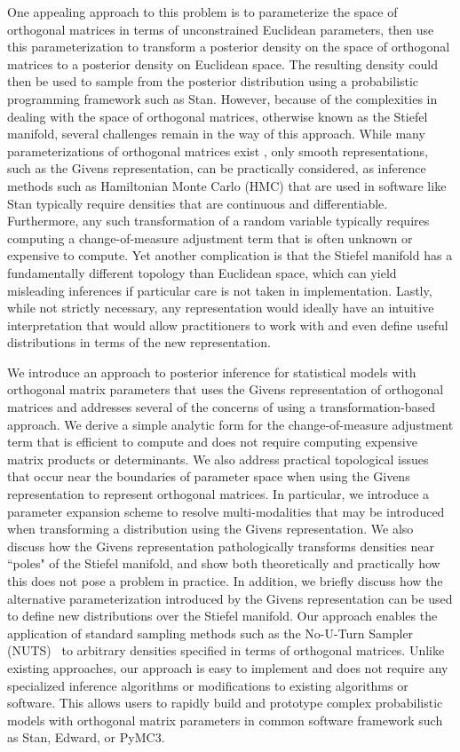 \documentclass[ba]{imsart}
\numberwithin{equation}{section}
\theoremstyle{plain}
\begin{document}
\noindent One appealing approach to this problem is to parameterize the space of orthogonal matrices in terms of unconstrained Euclidean parameters, then use this parameterization to transform a posterior density on the space of orthogonal matrices to a posterior density on Euclidean space. The resulting density could then be used to sample from the posterior distribution using a probabilistic programming framework such as Stan. However, because of the complexities in dealing with the space of orthogonal matrices, otherwise known as the Stiefel manifold, several challenges remain in the way of this approach. While many parameterizations of orthogonal matrices exist \citep{anderson1987generation, shepard2015representation}, only smooth representations, such as the Givens representation, can be practically considered, as inference methods such as Hamiltonian Monte Carlo (HMC) that are used in software like Stan typically require densities that are continuous and differentiable. Furthermore, any such transformation of a random variable typically requires computing a change-of-measure adjustment term that is often unknown or expensive to compute. Yet another complication is that the Stiefel manifold has a fundamentally different topology than Euclidean space, which can yield misleading inferences if particular care is not taken in implementation. Lastly, while not strictly necessary, any representation would ideally have an intuitive interpretation that would allow practitioners to work with and even define useful distributions in terms of the new representation.

\noindent We introduce an approach to posterior inference for statistical models with orthogonal matrix parameters that uses the Givens representation of orthogonal matrices and addresses several of the concerns of using a transformation-based approach. We derive a simple analytic form for the change-of-measure adjustment term that is efficient to compute and does not require computing expensive matrix products or determinants. We also address practical topological issues that occur near the boundaries of parameter space when using the Givens representation to represent orthogonal matrices. In particular, we introduce a parameter expansion scheme to resolve multi-modalities that may be introduced when transforming a distribution using the Givens representation. We also discuss how the Givens representation pathologically transforms densities near ``poles" of the Stiefel manifold, and show both theoretically and practically how this does not pose a problem in practice. In addition, we briefly discuss how the alternative parameterization introduced by the Givens representation can be used to define new distributions over the Stiefel manifold. Our approach enables the application of standard sampling methods such as the No-U-Turn Sampler (NUTS)~\citep{hoffman2014no} to arbitrary densities specified in terms of orthogonal matrices. Unlike existing approaches, our approach is easy to implement and does not require any specialized inference algorithms or modifications to existing algorithms or software. This allows users to rapidly build and prototype complex probabilistic models with orthogonal matrix parameters in common software framework such as Stan, Edward, or PyMC3. 
\end{document}
